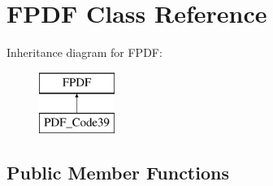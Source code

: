 \hypertarget{classFPDF}{}\section{F\+P\+D\+F Class Reference}
\label{classFPDF}
Inheritance diagram for F\+P\+D\+F\+:\begin{figure}[H]
\begin{center}
\leavevmode
\includegraphics[height=2.000000cm]{d5/dd8/classFPDF}
\end{center}
\end{figure}
\subsection*{Public Member Functions}
